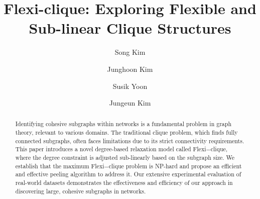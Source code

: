 \documentclass[sigconf]{acmart}
\newcommand{\flexi}{\textsf{Flexi$-$clique}}
\begin{document}
\title{Flexi-clique: Exploring Flexible and Sub-linear Clique Structures}




\author{Song Kim}



\author{Junghoon Kim}


\author{Susik Yoon}


\author{Jungeun Kim}



\renewcommand{\shortauthors}{Song Kim, Junghoon Kim, Susik Yoon, \& Jungeun Kim}


\begin{abstract}
Identifying cohesive subgraphs within networks is a fundamental problem in graph theory, relevant to various domains. The traditional clique problem, which finds fully connected subgraphs, often faces limitations due to its strict connectivity requirements. This paper introduces a novel degree-based relaxation model called {\flexi}, where the degree constraint is adjusted sub-linearly based on the subgraph size. We establish that the maximum {\flexi} problem is NP-hard and propose an efficient and effective peeling algorithm to address it. Our extensive experimental evaluation of real-world datasets demonstrates the effectiveness and efficiency of our approach in discovering large, cohesive subgraphs in networks.
\end{abstract}


\maketitle
\end{document}

